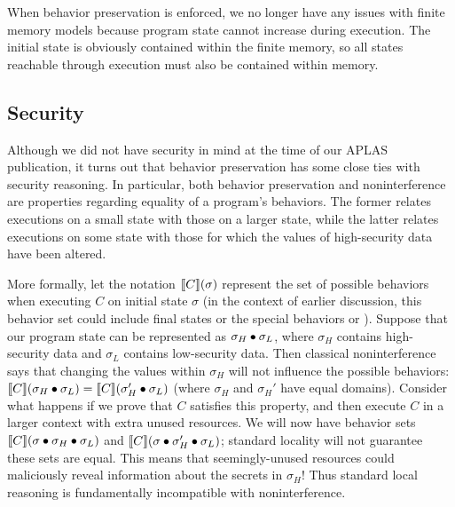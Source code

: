 When behavior preservation is enforced, we no longer have any issues
with finite memory models because program state cannot increase during
execution. The initial state is obviously contained within the finite
memory, so all states reachable through execution must also be
contained within memory.



\subsection{Security}
\label{metatheory-security}
Although we did not have security in mind at the time of our 
APLAS publication, it turns out that behavior preservation has some close 
ties with security
reasoning. In particular, both behavior preservation and noninterference
are properties regarding equality of a program's behaviors. The former
relates executions on a small state with those on a larger state, while
the latter relates executions on some state with those for which the
values of high-security data have been altered.

More formally, let the notation $\llbracket C \rrbracket(\sigma)$ represent the set of
possible behaviors when executing $C$ on initial state $\sigma$ (in the
context of earlier discussion, this behavior set could include final
states or the special behaviors \fault{} or \dvg{}). Suppose that
our program state can be represented as $\sigma_H \bullet \sigma_L$, where
$\sigma_H$ contains high-security data and $\sigma_L$ contains low-security
data. Then classical noninterference says that changing the values within
$\sigma_H$ will not influence the possible behaviors: 
$\llbracket C \rrbracket(\sigma_H \bullet \sigma_L) = \llbracket C \rrbracket(\sigma_H' \bullet \sigma_L)$
(where $\sigma_H$ and $\sigma_H'$ have equal domains). Consider
what happens if we prove that $C$ satisfies this property, and then
execute $C$ in a larger context with extra unused resources.
We will now have behavior sets $\llbracket C \rrbracket(\sigma \bullet \sigma_H \bullet \sigma_L)$
and $\llbracket C \rrbracket(\sigma \bullet \sigma_H' \bullet \sigma_L)$; standard locality
will not guarantee these sets are equal. This means that 
seemingly-unused resources could maliciously reveal information
about the secrets in $\sigma_H$! Thus standard local reasoning
is fundamentally incompatible with noninterference.

